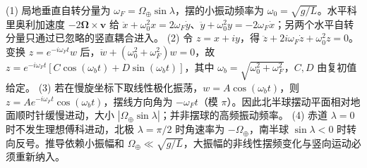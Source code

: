 (1) 局地垂直自转分量为 \(\omega_F=\Omega_\oplus\sin\lambda\)，摆的小振动频率为 \(\omega_0=\sqrt{g/L}\)。水平科里奥利加速度 \(-2\boldsymbol\Omega\times\mathbf v\) 给 \(\ddot x+\omega_0^2x=2\omega_F\dot y\)、\(\ddot y+\omega_0^2y=-2\omega_F\dot x\)；另两个水平自转分量只通过已忽略的竖直耦合进入。
(2) 令 \(z=x+iy\)，得 \(\ddot z+2i\omega_F\dot z+\omega_0^2z=0\)。变换 \(z=e^{-i\omega_F t}w\) 后，\(\ddot w+(\omega_0^2+\omega_F^2)w=0\)，故 \(z=e^{-i\omega_Ft}[C\cos(\omega_bt)+D\sin(\omega_bt)]\)，其中 \(\omega_b=\sqrt{\omega_0^2+\omega_F^2}\)，\(C,D\) 由复初值给定。
(3) 若在慢旋坐标下取线性极化振荡，\(w=A\cos(\omega_bt)\)，则 \(z=Ae^{-i\omega_Ft}\cos(\omega_bt)\)，摆线方向角为 \(-\omega_Ft\)（模 \(\pi\)）。因此北半球摆动平面相对地面顺时针缓慢进动，大小 \(|\Omega_\oplus\sin\lambda|\)；并非摆球的高频振动频率。
(4) 赤道 \(\lambda=0\) 时不发生理想傅科进动，北极 \(\lambda=\pi/2\) 时角速率为 \(-\Omega_\oplus\)，南半球 \(\sin\lambda<0\) 时转向反号。推导依赖小振幅和 \(\Omega_\oplus\ll\sqrt{g/L}\)，大振幅的非线性摆频变化与竖向运动必须重新纳入。
